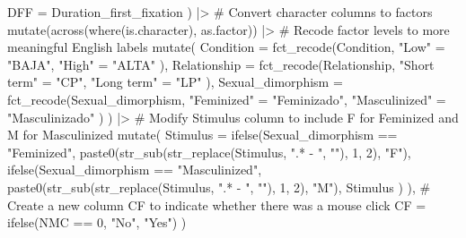 \documentclass[
  bookmarksnumbered]{article}
\newenvironment{Shaded}{\begin{snugshade}}{\end{snugshade}}
\newcommand{\AttributeTok}[1]{\textcolor[rgb]{0.80,0.80,0.80}{#1}}
\newcommand{\CommentTok}[1]{\textcolor[rgb]{0.50,0.62,0.50}{#1}}
\newcommand{\DecValTok}[1]{\textcolor[rgb]{0.86,0.86,0.80}{#1}}
\newcommand{\FunctionTok}[1]{\textcolor[rgb]{0.94,0.94,0.56}{#1}}
\newcommand{\NormalTok}[1]{\textcolor[rgb]{0.80,0.80,0.80}{#1}}
\newcommand{\OtherTok}[1]{\textcolor[rgb]{0.94,0.94,0.56}{#1}}
\newcommand{\SpecialCharTok}[1]{\textcolor[rgb]{0.86,0.64,0.64}{#1}}
\newcommand{\StringTok}[1]{\textcolor[rgb]{0.80,0.58,0.58}{#1}}
\begin{document}
\begin{Shaded}
\begin{Highlighting}[]
    \AttributeTok{DFF =}\NormalTok{ Duration\_first\_fixation}
\NormalTok{  ) }\SpecialCharTok{|\textgreater{}}
  \CommentTok{\# Convert character columns to factors}
  \FunctionTok{mutate}\NormalTok{(}\FunctionTok{across}\NormalTok{(}\FunctionTok{where}\NormalTok{(is.character), as.factor)) }\SpecialCharTok{|\textgreater{}}
  \CommentTok{\# Recode factor levels to more meaningful English labels}
  \FunctionTok{mutate}\NormalTok{(}
    \AttributeTok{Condition =} \FunctionTok{fct\_recode}\NormalTok{(Condition,}
      \StringTok{"Low"} \OtherTok{=} \StringTok{"BAJA"}\NormalTok{,}
      \StringTok{"High"} \OtherTok{=} \StringTok{"ALTA"}
\NormalTok{    ),}
    \AttributeTok{Relationship =} \FunctionTok{fct\_recode}\NormalTok{(Relationship,}
      \StringTok{"Short term"} \OtherTok{=} \StringTok{"CP"}\NormalTok{,}
      \StringTok{"Long term"} \OtherTok{=} \StringTok{"LP"}
\NormalTok{    ),}
    \AttributeTok{Sexual\_dimorphism =} \FunctionTok{fct\_recode}\NormalTok{(Sexual\_dimorphism,}
      \StringTok{"Feminized"} \OtherTok{=} \StringTok{"Feminizado"}\NormalTok{,}
      \StringTok{"Masculinized"} \OtherTok{=} \StringTok{"Masculinizado"}
\NormalTok{    )}
\NormalTok{  ) }\SpecialCharTok{|\textgreater{}}
  \CommentTok{\# Modify \textquotesingle{}Stimulus\textquotesingle{} column to include \textquotesingle{}F\textquotesingle{} for Feminized and \textquotesingle{}M\textquotesingle{} for Masculinized}
  \FunctionTok{mutate}\NormalTok{(}
    \AttributeTok{Stimulus =} \FunctionTok{ifelse}\NormalTok{(Sexual\_dimorphism }\SpecialCharTok{==} \StringTok{"Feminized"}\NormalTok{,}
      \FunctionTok{paste0}\NormalTok{(}\FunctionTok{str\_sub}\NormalTok{(}\FunctionTok{str\_replace}\NormalTok{(Stimulus, }\StringTok{".* {-} "}\NormalTok{, }\StringTok{""}\NormalTok{), }\DecValTok{1}\NormalTok{, }\DecValTok{2}\NormalTok{), }\StringTok{"F"}\NormalTok{),}
      \FunctionTok{ifelse}\NormalTok{(Sexual\_dimorphism }\SpecialCharTok{==} \StringTok{"Masculinized"}\NormalTok{,}
        \FunctionTok{paste0}\NormalTok{(}\FunctionTok{str\_sub}\NormalTok{(}\FunctionTok{str\_replace}\NormalTok{(Stimulus, }\StringTok{".* {-} "}\NormalTok{, }\StringTok{""}\NormalTok{), }\DecValTok{1}\NormalTok{, }\DecValTok{2}\NormalTok{), }\StringTok{"M"}\NormalTok{),}
\NormalTok{        Stimulus}
\NormalTok{      )}
\NormalTok{    ),}
    \CommentTok{\# Create a new column \textquotesingle{}CF\textquotesingle{} to indicate whether there was a mouse click}
    \AttributeTok{CF =} \FunctionTok{ifelse}\NormalTok{(NMC }\SpecialCharTok{==} \DecValTok{0}\NormalTok{, }\StringTok{"No"}\NormalTok{, }\StringTok{"Yes"}\NormalTok{)}
\NormalTok{  )}
\end{Highlighting}
\end{Shaded}
\end{document}
